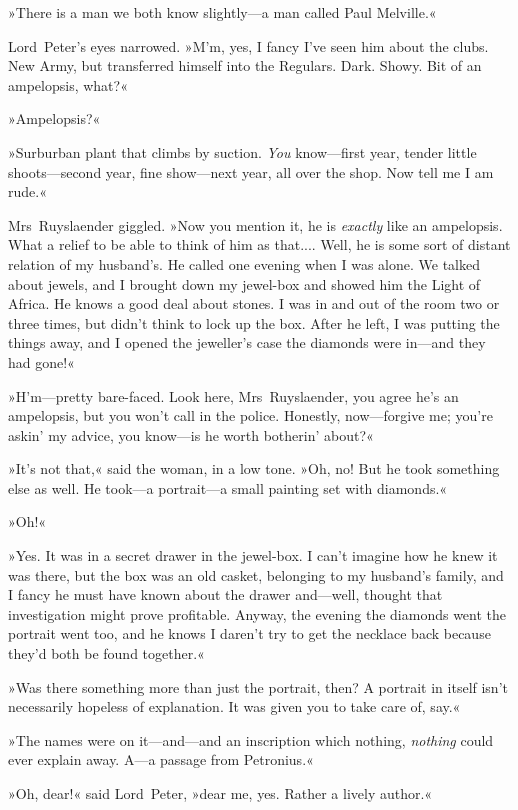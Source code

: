 »There is a man we both know slightly—a man called Paul Melville.«

Lord~Peter's eyes narrowed. »M'm, yes, I fancy I've seen him about the clubs. New Army, but transferred himself into the Regulars. Dark. Showy. Bit of an ampelopsis, what?«

»Ampelopsis?«

»Surburban plant that climbs by suction. \textit{You} know—first year, tender little shoots—second year, fine show—next year, all over the shop. Now tell me I am rude.«

Mrs~Ruyslaender giggled. »Now you mention it, he is \textit{exactly} like an ampelopsis. What a relief to be able to think of him as that.... Well, he is some sort of distant relation of my husband's. He called one evening when I was alone. We talked about jewels, and I brought down my jewel-box and showed him the Light of Africa. He knows a good deal about stones. I was in and out of the room two or three times, but didn't think to lock up the box. After he left, I was putting the things away, and I opened the jeweller's case the diamonds were in—and they had gone!«

»H'm—pretty bare-faced. Look here, Mrs~Ruyslaender, you agree he's an ampelopsis, but you won't call in the police. Honestly, now—forgive me; you're askin' my advice, you know—is he worth botherin' about?«

»It's not that,« said the woman, in a low tone. »Oh, no! But he took something else as well. He took—a portrait—a small painting set with diamonds.«

»Oh!«

»Yes. It was in a secret drawer in the jewel-box. I can't imagine how he knew it was there, but the box was an old casket, belonging to my husband's family, and I fancy he must have known about the drawer and—well, thought that investigation might prove profitable. Anyway, the evening the diamonds went the portrait went too, and he knows I daren't try to get the necklace back because they'd both be found together.«

»Was there something more than just the portrait, then? A portrait in itself isn't necessarily hopeless of explanation. It was given you to take care of, say.«

»The names were on it—and—and an inscription which nothing, \textit{nothing} could ever explain away. A—a passage from Petronius.«

»Oh, dear!« said Lord~Peter, »dear me, yes. Rather a lively author.«

